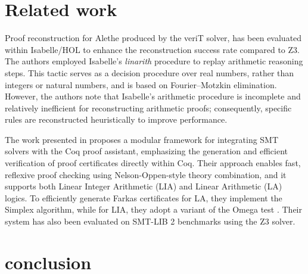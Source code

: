 \documentclass[runningheads]{llncs}
\begin{document}










\section{Related work}
\label{sec:related}

Proof reconstruction for Alethe produced by the veriT solver, has been evaluated within Isabelle/HOL to enhance the reconstruction success rate compared to Z3.
The authors employed Isabelle’s \emph{linarith} procedure to replay arithmetic reasoning steps. This tactic serves as a decision procedure over real numbers, rather than integers or natural numbers, and is based on Fourier–Motzkin elimination.
However, the authors note that Isabelle’s arithmetic procedure is incomplete and relatively inefficient for reconstructing arithmetic proofs; consequently, specific rules are reconstructed heuristically to improve performance.

The work presented in \cite{micromega} proposes a modular framework for integrating SMT solvers with the Coq proof assistant, emphasizing the generation and efficient verification of proof certificates directly within Coq.
Their approach enables fast, reflexive proof checking using Nelson-Oppen-style theory combination, and it supports both Linear Integer Arithmetic (LIA) and Linear Arithmetic (LA) logics.
To efficiently generate Farkas certificates for LA, they implement the Simplex algorithm, while for LIA, they adopt a variant of the Omega test \cite{omegatest}.
Their system has also been evaluated on SMT-LIB 2 benchmarks using the Z3 solver.



\section{conclusion}
\label{sec:conclusion}





\end{document}
